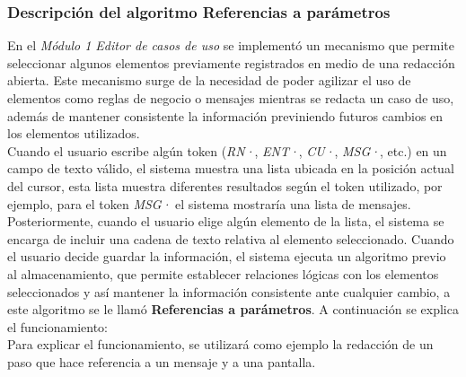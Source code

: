 	\subsubsection{Descripción del algoritmo Referencias a parámetros}
	
	En el {\it Módulo 1  Editor de casos de uso} se implementó un mecanismo que permite seleccionar algunos elementos previamente registrados en medio de una redacción abierta. Este mecanismo surge de la necesidad de poder agilizar el uso de elementos como reglas de negocio o mensajes mientras se redacta un caso de uso, además de mantener consistente la información previniendo futuros cambios en los elementos utilizados.\\
	

	Cuando el usuario escribe algún token ({\it RN·}, {\it ENT·}, {\it CU·}, {\it MSG·}, etc.) en un campo de texto válido, el sistema muestra una lista ubicada en la posición actual del cursor, esta lista muestra diferentes resultados según el token utilizado, por ejemplo, para el token {\it MSG·} el sistema mostraría una lista de mensajes. Posteriormente, cuando el usuario elige algún elemento de la lista, el sistema se encarga de incluir una cadena de texto relativa al elemento seleccionado. Cuando el usuario decide guardar la información, el sistema ejecuta un algoritmo previo al almacenamiento, que permite establecer relaciones lógicas con los elementos seleccionados y así mantener la información consistente ante cualquier cambio, a este algoritmo se le llamó {\bf Referencias a parámetros}. A continuación se explica el funcionamiento:\\
	
	Para explicar el funcionamiento, se utilizará como ejemplo la redacción de un paso que hace referencia a un mensaje y a una pantalla.
	
